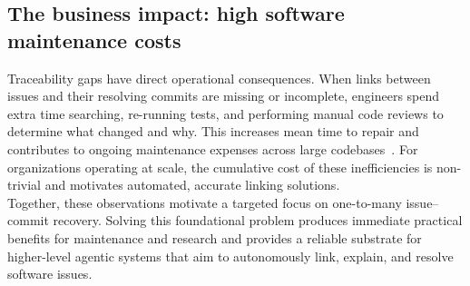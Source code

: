 \subsection{The business impact: high software maintenance costs}

Traceability gaps have direct operational consequences. When links between issues and their resolving commits are missing or incomplete, engineers spend extra time searching, re-running tests, and performing manual code reviews to determine what changed and why. This increases mean time to repair and contributes to ongoing maintenance expenses across large codebases~\cite{r15,r16}. For organizations operating at scale, the cumulative cost of these inefficiencies is non-trivial and motivates automated, accurate linking solutions.\\

\noindent
Together, these observations motivate a targeted focus on one-to-many issue–commit recovery. Solving this foundational problem produces immediate practical benefits for maintenance and research and provides a reliable substrate for higher-level agentic systems that aim to autonomously link, explain, and resolve software issues.

